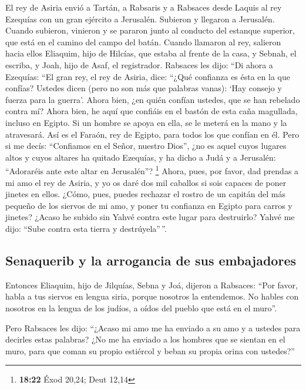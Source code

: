\begin{paracol}{2}
 El rey de Asiria envió a Tartán, a Rabsaris y a Rabsaces
desde Laquis al rey Ezequías con un gran ejército a Jerusalén. Subieron
y llegaron a Jerusalén. Cuando subieron, vinieron y se pararon junto al
conducto del estanque superior, que está en el camino del campo del
batán.  Cuando llamaron al rey, salieron hacia ellos
Eliaquim, hijo de Hilcías, que estaba al frente de la casa, y Sebnah, el
escriba, y Joah, hijo de Asaf, el registrador.  Rabsaces
les dijo: ``Di ahora a Ezequías: ``El gran rey, el rey de Asiria, dice:
``¿Qué confianza es ésta en la que confías?  Ustedes
dicen (pero no son más que palabras vanas): `Hay consejo y fuerza para
la guerra'. Ahora bien, ¿en quién confían ustedes, que se han rebelado
contra mí?  Ahora bien, he aquí que confiáis en el bastón
de esta caña magullada, incluso en Egipto. Si un hombre se apoya en
ella, se le meterá en la mano y la atravesará. Así es el Faraón, rey de
Egipto, para todos los que confían en él.  Pero si me
decís: ``Confiamos en el Señor, nuestro Dios'', ¿no es aquel cuyos
lugares altos y cuyos altares ha quitado Ezequías, y ha dicho a Judá y a
Jerusalén: ``Adoraréis ante este altar en Jerusalén''? \footnote{\textbf{18:22}
  Éxod 20,24; Deut 12,14}  Ahora, pues, por favor, dad
prendas a mi amo el rey de Asiria, y yo os daré dos mil caballos si sois
capaces de poner jinetes en ellos.  ¿Cómo, pues, puedes
rechazar el rostro de un capitán del más pequeño de los siervos de mi
amo, y poner tu confianza en Egipto para carros y jinetes?
 ¿Acaso he subido sin Yahvé contra este lugar para
destruirlo? Yahvé me dijo: ``Sube contra esta tierra y destrúyela''\,''.

\hypertarget{senaquerib-y-la-arrogancia-de-sus-embajadores}{%
\subsection{Senaquerib y la arrogancia de sus
embajadores}\label{senaquerib-y-la-arrogancia-de-sus-embajadores}}

 Entonces Eliaquim, hijo de Jilquías, Sebna y Joá,
dijeron a Rabsaces: ``Por favor, habla a tus siervos en lengua siria,
porque nosotros la entendemos. No hables con nosotros en la lengua de
los judíos, a oídos del pueblo que está en el muro''.

 Pero Rabsaces les dijo: ``¿Acaso mi amo me ha enviado a
su amo y a ustedes para decirles estas palabras? ¿No me ha enviado a los
hombres que se sientan en el muro, para que coman su propio estiércol y
beban su propia orina con ustedes?''


\end{paracol}
